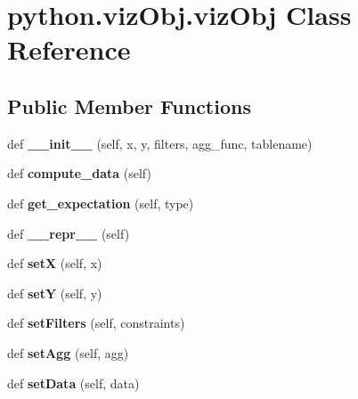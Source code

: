 \hypertarget{classpython_1_1viz_obj_1_1viz_obj}{}\section{python.\+viz\+Obj.\+viz\+Obj Class Reference}
\label{classpython_1_1viz_obj_1_1viz_obj}
\subsection*{Public Member Functions}
\begin{DoxyCompactItemize}
\item 
\mbox{\label{classpython_1_1viz_obj_1_1viz_obj_a5ddc5a55f42597631fe87641b0bbdbde}} 
def {\bfseries \+\_\+\+\_\+init\+\_\+\+\_\+} (self, x, y, filters, agg\+\_\+func, tablename)
\item 
\mbox{\label{classpython_1_1viz_obj_1_1viz_obj_a6cf37f61bcfc10c0bf921d2398768897}} 
def {\bfseries compute\+\_\+data} (self)
\item 
\mbox{\label{classpython_1_1viz_obj_1_1viz_obj_a49866f258bf6252c73231986bdb47511}} 
def {\bfseries get\+\_\+expectation} (self, type)
\item 
\mbox{\label{classpython_1_1viz_obj_1_1viz_obj_ae5f17c5a58c7e65e79368ba404592e1f}} 
def {\bfseries \+\_\+\+\_\+repr\+\_\+\+\_\+} (self)
\item 
\mbox{\label{classpython_1_1viz_obj_1_1viz_obj_adf6d68d9b487ec722363b184856b97ca}} 
def {\bfseries setX} (self, x)
\item 
\mbox{\label{classpython_1_1viz_obj_1_1viz_obj_ac8f7a37eb0a8fb90efd1ad4a616df85c}} 
def {\bfseries setY} (self, y)
\item 
\mbox{\label{classpython_1_1viz_obj_1_1viz_obj_a9a836d363cb7298561f2b9bf81971b72}} 
def {\bfseries set\+Filters} (self, constraints)
\item 
\mbox{\label{classpython_1_1viz_obj_1_1viz_obj_aad67c0b9d42537221984ea137f61852a}} 
def {\bfseries set\+Agg} (self, agg)
\item 
\mbox{\label{classpython_1_1viz_obj_1_1viz_obj_aac229622c299dd653bea00b054e295b2}} 
def {\bfseries set\+Data} (self, data)
\end{DoxyCompactItemize}
